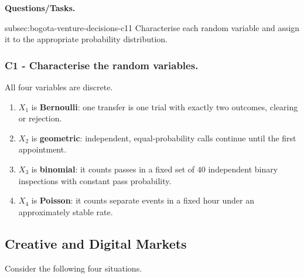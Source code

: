 	\textbf{Questions/Tasks.}
	\begin{enumerate}
		\CriterionTask
		{subsec:bogota-venture-decisions-c1}{1}
		{Characterise each random variable and assign it to the appropriate probability distribution.}
	\end{enumerate}

	\subsubsection*{C1 - Characterise the random variables.}
	\phantomsection
	\label{subsec:bogota-venture-decisions-c1}

	All four variables are discrete.
	\begin{enumerate}
		\item $X_1$ is \textbf{Bernoulli}: one transfer is one trial with exactly two outcomes, clearing or rejection.
		\item $X_2$ is \textbf{geometric}: independent, equal-probability calls continue until the first appointment.
		\item $X_3$ is \textbf{binomial}: it counts passes in a fixed set of $40$ independent binary inspections with constant pass probability.
		\item $X_4$ is \textbf{Poisson}: it counts separate events in a fixed hour under an approximately stable rate.
	\end{enumerate}


	\subsection{Creative and Digital Markets}
	\label{sec:creative-digital-markets}

	Consider the following four situations.

